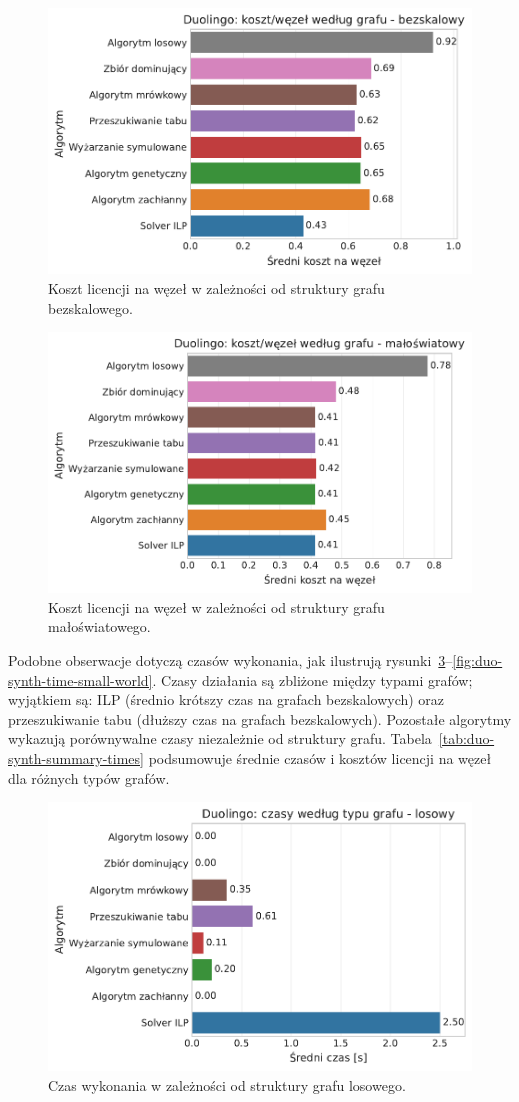 \begin{figure}[H]
  \centering
  \includegraphics[width=0.65\linewidth]{assets/figures/benchmark/synthetic/duolingo_cost_per_node_by_graph_scale_free.pdf}
  \caption{Koszt licencji na węzeł w zależności od struktury grafu bezskalowego.}
  \label{fig:duo-synth-cost-scale-free}
\end{figure}

\begin{figure}[H]
  \centering
  \includegraphics[width=0.65\linewidth]{assets/figures/benchmark/synthetic/duolingo_cost_per_node_by_graph_small_world.pdf}
  \caption{Koszt licencji na węzeł w zależności od struktury grafu małoświatowego.}
  \label{fig:duo-synth-cost-small-world}
\end{figure}

Podobne obserwacje dotyczą czasów wykonania, jak ilustrują rysunki~\ref{fig:duo-synth-time-random}--\ref{fig:duo-synth-time-small-world}. Czasy działania są zbliżone między typami grafów; wyjątkiem są: ILP (średnio krótszy czas na grafach bezskalowych) oraz przeszukiwanie tabu (dłuższy czas na grafach bezskalowych). Pozostałe algorytmy wykazują porównywalne czasy niezależnie od struktury grafu. Tabela~\ref{tab:duo-synth-summary-times} podsumowuje średnie czasów i kosztów licencji na węzeł dla różnych typów grafów.

\begin{figure}[H]
  \centering
  \includegraphics[width=0.65\linewidth]{assets/figures/benchmark/synthetic/duolingo_time_by_graph_random.pdf}
  \caption{Czas wykonania w zależności od struktury grafu losowego.}
  \label{fig:duo-synth-time-random}
\end{figure}

